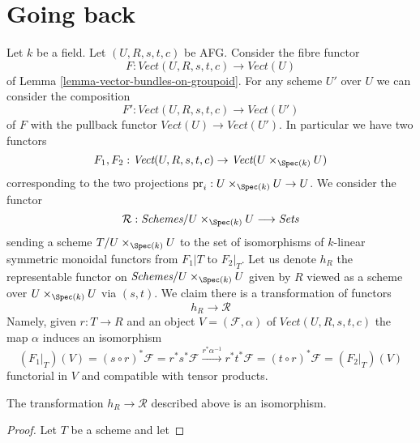 \section{Going back}
\label{section-going-back}

\noindent
Let $k$ be a field. Let $(U, R, s, t, c)$ be AFG. Consider the fibre functor
$$
F : \textit{Vect}(U, R, s, t, c) \to \textit{Vect}(U)
$$
of Lemma \ref{lemma-vector-bundles-on-groupoid}. For any scheme
$U'$ over $U$ we can consider the composition
$$
F' : \textit{Vect}(U, R, s, t, c) \to \textit{Vect}(U')
$$
of $F$ with the pullback functor $\textit{Vect}(U) \to \textit{Vect}(U')$.
In particular we have two functors
$$
F_1, F_2 :
\textit{Vect}(U, R, s, t, c)
\to
\textit{Vect}(U \times_{\Spec(k)} U)
$$
corresponding to the two projections
$\text{pr}_i : U \times_{\Spec(k)} U \to U$. We consider the functor
$$
\mathcal{R} :
\textit{Schemes}/U \times_{\Spec(k)} U \longrightarrow \textit{Sets}
$$
sending a scheme $T/U \times_{\Spec(k)} U$ to the set of isomorphisms
of $k$-linear symmetric monoidal functors from $F_1|T$ to $F_2|_T$.
Let us denote $h_R$ the representable functor
on $\textit{Schemes}/U \times_{\Spec(k)} U$ given by $R$ viewed as
a scheme over $U \times_{\Spec(k)} U$ via $(s, t)$.
We claim there is a transformation of functors
$$
h_R \longrightarrow \mathcal{R}
$$
Namely, given $r : T \to R$ and an object $V = (\mathcal{F}, \alpha)$ of
$\textit{Vect}(U, R, s, t, c)$ the map $\alpha$ induces an isomorphism
$$
(F_1|_T)(V) = (s \circ r)^*\mathcal{F} = r^*s^*\mathcal{F}
\xrightarrow{r^*\alpha^{-1}}
r^*t^*\mathcal{F} = (t \circ r)^*\mathcal{F} = (F_2|_T)(V)
$$
functorial in $V$ and compatible with tensor products.

\begin{lemma}
\label{lemma-equivalence}
The transformation $h_R \longrightarrow \mathcal{R}$
described above is an isomorphism.
\end{lemma}

\begin{proof}
Let $T$ be a scheme and let
\end{proof}














